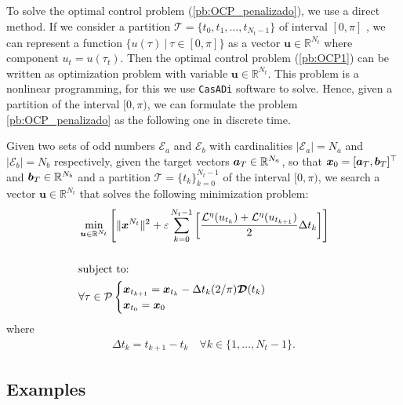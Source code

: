 \documentclass[twocolumn]{autart}    %
\begin{document}
To solve the optimal control problem (\ref{pb:OCP_penalizado}), we use a direct method. 
%
If we consider a partition $\mathcal{T} = \{t_0,t_1,\dots,t_{N_t-1}\}$ of interval $[0,\pi]$ , we can represent a function $\{ u(\tau) \ | \ \tau \in [0,\pi]\}$ as a vector $\bm{u} \in \mathbb{R}^{N_t}$ where component $u_t = u(\tau_t)$.  
%
Then the optimal control problem (\ref{pb:OCP1}) can be written as optimization problem with variable $\bm{u} \in \mathbb{R}^{N_t}$. This problem is a nonlinear programming, for this we use \texttt{CasADi} software to solve. 
%
Hence, given a partition of the interval $[0,\pi)$, we can formulate the problem \ref{pb:OCP_penalizado} as the following one in discrete time.
\newline

\begin{problem}\label{pb:numOCP2}
Given two sets of odd numbers $\mathcal{E}_a$ and $\mathcal{E}_b$ with cardinalities $|\mathcal{E}_a| = N_a$ and $|\mathcal{E}_b| = N_b$ respectively, given the target vectors $\bm{a}_T  \in \mathbb{R}^{N_a}$, so that $\bm{x}_0 = [\bm{a}_T,\bm{b}_T]^\top$ and $\bm{b}_T \in \mathbb{R}^{N_b}$ and a partition $\mathcal{T} = \{t_k\}_{k=0}^{N_t-1}$ of the interval $[0,\pi)$, we search a vector $\bm{u} \in \mathbb{R}^{N_t}$ that solves the following minimization problem:
\begin{align*}
	&\min_{\bm{u} \in \mathbb{R}^{N_t}} \Bigg[\| \bm{x}^{N_t}\|^2 + \varepsilon \sum_{k=0}^{N_t-1} 
	\bigg[\frac{\mathcal{L}^\eta(u_{t_k}) + \mathcal{L}^\eta(u_{t_{k+1}})}{2}\Delta t_k \bigg]  \Bigg]  
	\\[15pt]
    &\notag \text{subject to: } 
    \\
    &\forall \tau \in \mathcal{P} \begin{cases}
    \bm{x}_{t_{k+1}} = \bm{x}_{t_k} - \Delta t_{k} (2/\pi) \bm{\mathcal{D}}(t_k)\\
    \bm{x}_{t_0} = \bm{x}_0
    \end{cases} 
\end{align*}
where 
\begin{gather}
	\Delta t_{k} = t_{k+1} - t_{k} \hspace{1em} \forall k \in \{1,\dots,N_t-1\}.
\end{gather}
\end{problem}

\subsection{Examples}
\end{document}
